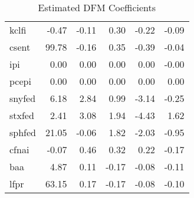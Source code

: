 \documentclass[11pt, letterpaper]{article}\usepackage[]{graphicx}\usepackage[]{color}
\begin{document}
\begin{table}[H]
\begin{tabular}{lrrrrr}
  kclfi & -0.47 & -0.11 & 0.30 & -0.22 & -0.09 \\ 
  csent & 99.78 & -0.16 & 0.35 & -0.39 & -0.04 \\ 
  ipi & 0.00 & 0.00 & 0.00 & 0.00 & -0.00 \\ 
  pcepi & 0.00 & 0.00 & 0.00 & 0.00 & 0.00 \\ 
  snyfed & 6.18 & 2.84 & 0.99 & -3.14 & -0.25 \\ 
  stxfed & 2.41 & 3.08 & 1.94 & -4.43 & 1.62 \\ 
  sphfed & 21.05 & -0.06 & 1.82 & -2.03 & -0.95 \\ 
  cfnai & -0.07 & 0.46 & 0.32 & 0.22 & -0.17 \\ 
  baa & 4.87 & 0.11 & -0.17 & -0.08 & -0.11 \\ 
  lfpr & 63.15 & 0.17 & -0.17 & -0.08 & -0.10 \\ 
   \hline
\end{tabular}
\endgroup
\caption{Estimated DFM Coefficients} 
\end{table}
\end{document}
